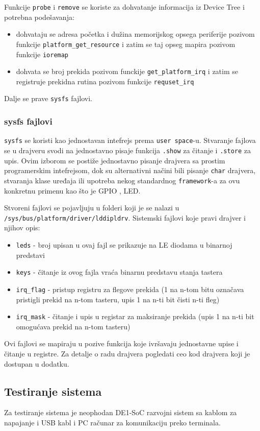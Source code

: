 Funkcije \texttt{probe} i \texttt{remove} se koriste za dohvatanje informacija iz Device Tree i potrebna podešavanja:
\begin{itemize}
\item dohvataju se adresa početka i dužina memorijskog opsega periferije pozivom funkcije \texttt{platform\_get\_resource} i zatim se taj opseg mapira pozivom funkcije \texttt{ioremap}
\item dohvata se broj prekida pozivom funckije \texttt{get\_platform\_irq} i zatim se registruje prekidna rutina pozivom funkcije \texttt{requset\_irq}
\end{itemize}

Dalje se prave \texttt{sysfs} fajlovi.

\subsubsection*{sysfs fajlovi}
\texttt{sysfs} se koristi kao jednostavan intefrejs prema \texttt{user space}-u. Stvaranje fajlova se u drajveru svodi na jednostavno pisaje funkcija \texttt{.show} za čitanje i \texttt{.store} za upis. Ovim izborom se postiže jednostavno pisanje drajvera sa prostim programerskim intefrejsom, dok su alternativni načini bili pisanje \texttt{char} drajvera, stvaranja klase uređaja ili upotreba nekog standardnog \texttt{framework}-a za ovu konkretnu primenu kao što je GPIO	, LED.

Stvoreni fajlovi se pojavljuju u folderi koji je se nalazi u \texttt{/sys/bus/platform/driver/lddipldrv}. Sistemski fajlovi koje pravi drajver i njihov opis:
\begin{itemize}
\item \texttt{leds} - broj upisan u ovaj fajl se prikazuje na LE diodama u binarnoj predstavi
\item \texttt{keys} - čitanje iz ovog fajla vraća binarnu predstavu stanja tastera
\item \texttt{irq\_flag} - pristup registru za flegove prekida (1 na n-tom bitu označava pristigli prekid na n-tom tasteru, upis 1 na n-ti bit čisti n-ti fleg)
\item \texttt{irq\_mask} - čitanje i upis u registar za maksiranje prekida (upis 1 na n-ti bit omogućava prekid na n-tom tasteru)
\end{itemize}

Ovi fajlovi se mapiraju u pozive funkcija koje ivršavaju jednostavne upise i čitanje u registre. Za detalje o radu drajvera pogledati ceo kod drajvera koji je dostupan u dodatku.
\subsection*{Testiranje sistema}
Za testiranje sistema je neophodan DE1-SoC razvojni sistem sa kablom za napajanje i USB kabl i PC računar za komunikaciju preko terminala.


